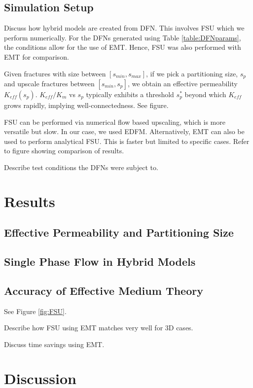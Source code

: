 \documentclass[a4paper]{article}
\begin{document}
\subsection{Simulation Setup}
Discuss how hybrid models are created from DFN. This involves FSU which we perform numerically. For the DFNs generated using Table \ref{table:DFNparams}, the conditions allow for the use of EMT. Hence, FSU was also performed with EMT for comparison.

Given fractures with size between $[s_{min},s_{max}]$, if we pick a partitioning size, $s_p$ and upscale fractures between $[s_{min},s_p]$, we obtain an effective permeability $K_{eff}(s_p)$. $K_{eff}/K_m$ vs $s_p$ typically exhibits a threshold $s_p^*$ beyond which $K_{eff}$ grows rapidly, implying well-connectedness. See figure.

FSU can be performed via numerical flow based upscaling, which is more versatile but slow. In our case, we used EDFM. Alternatively, EMT can also be used to perform analytical FSU. This is faster but limited to specific cases. Refer to figure showing comparison of results.

Describe test conditions the DFNs were subject to.

\section{Results}
\subsection{Effective Permeability and Partitioning Size}


\subsection{Single Phase Flow in Hybrid Models}



\subsection{Accuracy of Effective Medium Theory}
See Figure \ref{fig:FSU}.

Describe how FSU using EMT matches very well for 3D cases.

Discuss time savings using EMT.

\section{Discussion}
\end{document}
